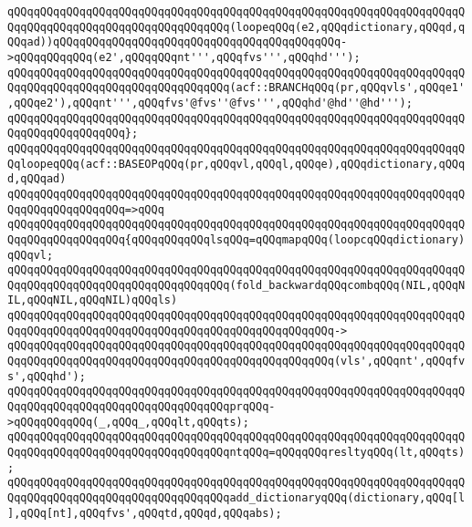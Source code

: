\verb|qQQqqQQqqQQqqQQqqQQqqQQqqQQqqQQqqQQqqQQqqQQqqQQqqQQqqQQqqQQqqQQqqQQqqQQqqQQqqQQqqQQqqQQqqQQqqQQqqQQqqQQq(loopeqQQq(e2,qQQqdictionary,qQQqd,qQQqad))qQQqqQQqqQQqqQQqqQQqqQQqqQQqqQQqqQQqqQQqqQQq->qQQqqQQqqQQq(e2',qQQqqQQqnt''',qQQqfvs''',qQQqhd''');|\newline
\newline
\verb|qQQqqQQqqQQqqQQqqQQqqQQqqQQqqQQqqQQqqQQqqQQqqQQqqQQqqQQqqQQqqQQqqQQqqQQqqQQqqQQqqQQqqQQqqQQqqQQqqQQqqQQq(acf::BRANCHqQQq(pr,qQQqvls',qQQqe1',qQQqe2'),qQQqnt''',qQQqfvs'@fvs''@fvs''',qQQqhd'@hd''@hd''');|\newline
\verb|qQQqqQQqqQQqqQQqqQQqqQQqqQQqqQQqqQQqqQQqqQQqqQQqqQQqqQQqqQQqqQQqqQQqqQQqqQQqqQQqqQQqqQQq};|\newline
\newline
\verb|qQQqqQQqqQQqqQQqqQQqqQQqqQQqqQQqqQQqqQQqqQQqqQQqqQQqqQQqqQQqqQQqqQQqqQQqloopeqQQq(acf::BASEOPqQQq(pr,qQQqvl,qQQql,qQQqe),qQQqdictionary,qQQqd,qQQqad)|\newline
\verb|qQQqqQQqqQQqqQQqqQQqqQQqqQQqqQQqqQQqqQQqqQQqqQQqqQQqqQQqqQQqqQQqqQQqqQQqqQQqqQQqqQQqqQQq=>qQQq|\newline
\verb|qQQqqQQqqQQqqQQqqQQqqQQqqQQqqQQqqQQqqQQqqQQqqQQqqQQqqQQqqQQqqQQqqQQqqQQqqQQqqQQqqQQqqQQq{qQQqqQQqqQQqlsqQQq=qQQqmapqQQq(loopcqQQqdictionary)qQQqvl;|\newline
\newline
\verb|qQQqqQQqqQQqqQQqqQQqqQQqqQQqqQQqqQQqqQQqqQQqqQQqqQQqqQQqqQQqqQQqqQQqqQQqqQQqqQQqqQQqqQQqqQQqqQQqqQQqqQQq(fold_backwardqQQqcombqQQq(NIL,qQQqNIL,qQQqNIL,qQQqNIL)qQQqls)|\newline
\verb|qQQqqQQqqQQqqQQqqQQqqQQqqQQqqQQqqQQqqQQqqQQqqQQqqQQqqQQqqQQqqQQqqQQqqQQqqQQqqQQqqQQqqQQqqQQqqQQqqQQqqQQqqQQqqQQqqQQqqQQq->|\newline
\verb|qQQqqQQqqQQqqQQqqQQqqQQqqQQqqQQqqQQqqQQqqQQqqQQqqQQqqQQqqQQqqQQqqQQqqQQqqQQqqQQqqQQqqQQqqQQqqQQqqQQqqQQqqQQqqQQqqQQqqQQq(vls',qQQqnt',qQQqfvs',qQQqhd');|\newline
\newline
\verb|qQQqqQQqqQQqqQQqqQQqqQQqqQQqqQQqqQQqqQQqqQQqqQQqqQQqqQQqqQQqqQQqqQQqqQQqqQQqqQQqqQQqqQQqqQQqqQQqqQQqqQQqprqQQq->qQQqqQQqqQQq(_,qQQq_,qQQqlt,qQQqts);|\newline
\newline
\verb|qQQqqQQqqQQqqQQqqQQqqQQqqQQqqQQqqQQqqQQqqQQqqQQqqQQqqQQqqQQqqQQqqQQqqQQqqQQqqQQqqQQqqQQqqQQqqQQqqQQqqQQqntqQQq=qQQqqQQqresltyqQQq(lt,qQQqts);|\newline
\newline
\verb|qQQqqQQqqQQqqQQqqQQqqQQqqQQqqQQqqQQqqQQqqQQqqQQqqQQqqQQqqQQqqQQqqQQqqQQqqQQqqQQqqQQqqQQqqQQqqQQqqQQqqQQqadd_dictionaryqQQq(dictionary,qQQq[l],qQQq[nt],qQQqfvs',qQQqtd,qQQqd,qQQqabs);|\newline
